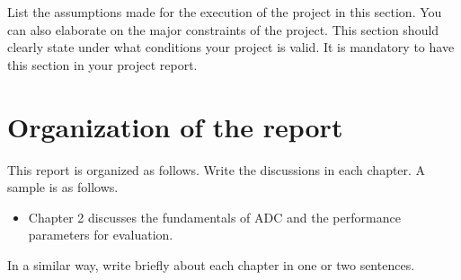 List the assumptions made for the execution of the project in this section. You can also elaborate on the major constraints of the project. This section should clearly state under what conditions your project is valid. It is mandatory to have this section in your project report.

\section[Organization of the report]{\textbf{Organization of the report}}

This report is organized as follows. Write the discussions in each chapter. A sample is as follows.
\begin{itemize}
\item Chapter 2 discusses the fundamentals of ADC and the performance parameters for evaluation.
\end{itemize}

In a similar way, write briefly about each chapter in one or two sentences.